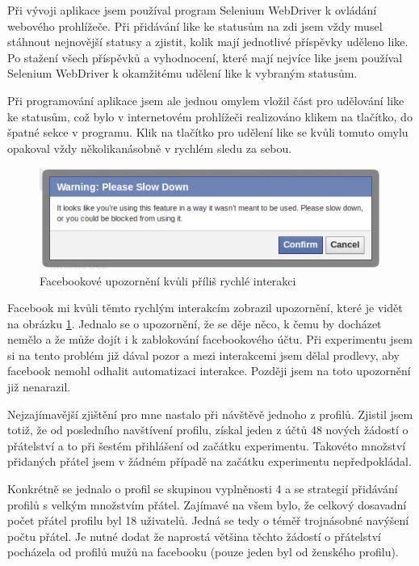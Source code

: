 \documentclass[thesis=M,czech]{FITthesis}[2013/05/10]
\begin{document}
Při vývoji aplikace jsem používal program Selenium WebDriver k ovládání webového prohlížeče. Při přidávání like ke statusům na zdi jsem vždy musel stáhnout nejnovější statusy a zjistit, kolik mají jednotlivé příspěvky uděleno like. Po stažení všech příspěvků a vyhodnocení, které mají nejvíce like jsem používal Selenium WebDriver k okamžitému udělení like k vybraným statusům. 

Při programování aplikace jsem ale jednou omylem vložil část pro udělování like ke statusům, což bylo v internetovém prohlížeči realizováno klikem na tlačítko, do špatné sekce v programu. Klik na tlačítko pro udělení like se kvůli tomuto omylu opakoval vždy několikanásobně v rychlém sledu za sebou.

\begin{figure}[h]
\begin{center}
\includegraphics[width=5in]{figures/slowDown.png}
\caption{Facebookové upozornění kvůli příliš rychlé interakci}
\label{fig:slowDown}
\end{center}
\end{figure}

Facebook mi kvůli těmto rychlým interakcím zobrazil upozornění, které je vidět na obrázku \ref{fig:slowDown}. Jednalo se o upozornění, že se děje něco, k čemu by docházet nemělo a že může dojít i k zablokování facebookového účtu. Při experimentu jsem si na tento problém již dával pozor a mezi interakcemi jsem dělal prodlevy, aby facebook nemohl odhalit automatizaci interakce. Později jsem na toto upozornění již nenarazil.

Nejzajímavější zjištění pro mne nastalo při návštěvě jednoho z profilů. Zjistil jsem totiž, že od posledního navštívení profilu, získal jeden z účtů 48 nových žádostí o přátelství a to při šestém přihlášení od začátku experimentu. Takovéto množství přidaných přátel jsem v žádném případě na začátku experimentu nepředpokládal.

Konkrétně se jednalo o profil se skupinou vyplněnosti 4 a se strategií přidávání profilů s velkým množstvím přátel. Zajímavé na všem bylo, že celkový dosavadní počet přátel profilu byl 18 uživatelů. Jedná se tedy o téměř trojnásobné navýšení počtu přátel. Je nutné dodat že naprostá většina těchto žádostí o přátelství pocházela od profilů mužů na facebooku (pouze jeden byl od ženského profilu).
\end{document}
